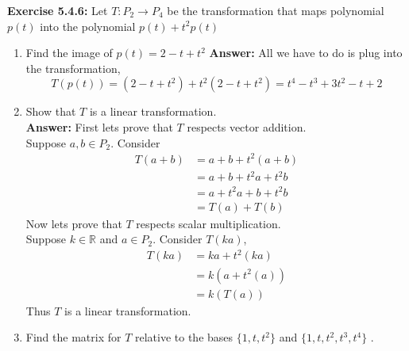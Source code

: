 \documentclass{amsart}
\def\RR{{\mathbb R}}
\begin{document}
\noindent\textbf{Exercise 5.4.6: } Let $T: P_2 \to P_4$ be the transformation that maps polynomial $p(t)$ into the polynomial $p(t) + t^2p(t)$\\

\begin{enumerate}

\item Find the image of $p(t) = 2-t+t^2$
\noindent \textbf{Answer: } All we have to do is plug into the transformation,
\begin{equation*}
T(p(t)) = (2-t+t^2) + t^2(2-t+t^2) = t^4-t^3+3t^2-t+2 
\end{equation*}
\vspace{1in}


\item Show that $T$ is a linear transformation.\\ 
\noindent \textbf{Answer: } First lets prove that $T$ respects vector addition.\\
Suppose $a,b \in P_2$. Consider 
\begin{align*}
T(a+b) &= a+b + t^2(a+b)\\
&= a+b + t^2a + t^2b\\
&= a+ t^2a+ b + t^2b\\
&= T(a)+ T(b)
\end{align*}
Now lets prove that $T$ respects scalar multiplication.\\
Suppose $k \in \RR$ and $a \in P_2$. Consider $T(ka)$,
\begin{align*}
T(ka) &= ka +t^2(ka)\\
 &= k(a +t^2(a))\\
&= k(T(a))
\end{align*}
Thus $T$ is a linear transformation. 
\vspace{1in}

\item Find the matrix for $T$ relative to the bases $\{1, t, t^2 \}$ and $\{ 1, t, t^2, t^3, t^4\}$ .\\


\end{enumerate}
\end{document}
